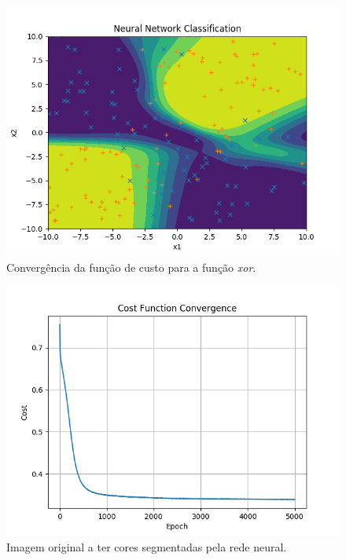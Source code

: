 \documentclass[conference]{IEEEtran}
\begin{document}
\begin{figure}[htbp]
\centering
\centerline{\includegraphics[scale=0.5]{imagens/xor/lambda_zero/nn_classification_xor.png}}
\caption{Convergência da função de custo para a função \textit{xor}.}
\label{xor/lambda_zero/nn_classification_xor}
\end{figure}

\begin{figure}[htbp]
\centering
\centerline{\includegraphics[scale=0.5]{imagens/xor/convergence_xor.png}}
\caption{Imagem original a ter cores segmentadas pela rede neural.}
\label{xor/convergence_xor}
\end{figure}
\end{document}
